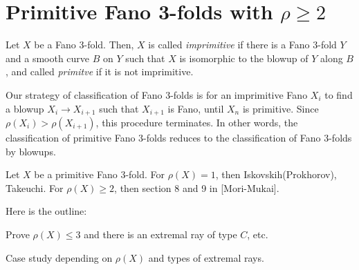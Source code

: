 \documentclass{../../small}
\begin{document}
\section*{Primitive Fano 3-folds with $\rho\ge2$}

\begin{defn}
Let $X$ be a Fano 3-fold.
Then, $X$ is called \emph{imprimitive} if there is a Fano 3-fold $Y$ and a smooth curve $B$ on $Y$ such that $X$ is isomorphic to the blowup of $Y$ along $B$, and called \emph{primitve} if it is not imprimitive.
\end{defn}

Our strategy of classification of Fano 3-folds is for an imprimitive Fano $X_i$ to find a blowup $X_i\to X_{i+1}$ such that $X_{i+1}$ is Fano, until $X_n$ is primitive.
Since $\rho(X_i)>\rho(X_{i+1})$, this procedure terminates.
In other words, the classification of primitive Fano 3-folds reduces to the classification of Fano 3-folds by blowups.

\begin{rmk}
Let $X$ be a primitive Fano 3-fold.
For $\rho(X)=1$, then Iskovskih(Prokhorov), Takeuchi.
For $\rho(X)\ge2$, then section 8 and 9 in [Mori-Mukai].
\end{rmk}

Here is the outline:
\begin{parts}
\item Prove $\rho(X)\le3$ and there is an extremal ray of type $C$, etc.
\item Case study depending on $\rho(X)$ and types of extremal rays.
\end{parts}
\end{document}
